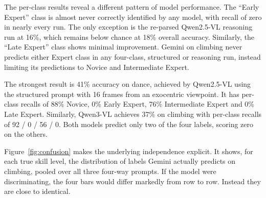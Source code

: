 \documentclass[logo,msc]{infthesis}
\begin{document}
The per-class results reveal a different pattern of model performance. The
``Early Expert'' class is almost never correctly identified by any model,
with recall of zero in nearly every run. The only exception is the
re-parsed Qwen2.5-VL reasoning run at 16\%, which remains below chance at
18\% overall accuracy. Similarly, the ``Late Expert'' class shows minimal
improvement. Gemini on climbing never predicts either Expert class in any
four-class, structured or reasoning run, instead limiting its predictions
to Novice and Intermediate Expert.

The strongest result is 41\% accuracy on dance, achieved by Qwen2.5-VL
using the structured prompt with 16 frames from an exocentric viewpoint. It
has per-class recalls of 88\% Novice, 0\% Early Expert, 76\% Intermediate
Expert and 0\% Late Expert. Similarly, Qwen3-VL achieves 37\% on climbing
with per-class recalls of 92 / 0 / 56 / 0. Both models predict only two of
the four labels, scoring zero on the others.

Figure~\ref{fig:confusion} makes the underlying independence explicit. It
shows, for each true skill level, the distribution of labels Gemini
actually predicts on climbing, pooled over all three four-way prompts. If
the model were discriminating, the four bars would differ markedly from row
to row. Instead they are close to identical.
\end{document}
